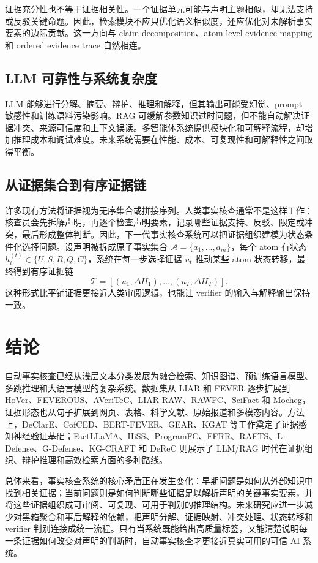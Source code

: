 \documentclass[UTF8,a4paper,zihao=5,twocolumn]{ctexart}
\begin{document}
证据充分性也不等于证据相关性。一个证据单元可能与声明主题相似，却无法支持或反驳关键命题。因此，检索模块不应只优化语义相似度，还应优化对未解析事实要素的边际贡献。这一方向与 claim decomposition、atom-level evidence mapping 和 ordered evidence trace 自然相连。

\subsection{LLM 可靠性与系统复杂度}

LLM 能够进行分解、摘要、辩护、推理和解释，但其输出可能受幻觉、prompt 敏感性和训练语料污染影响。RAG 可缓解参数知识过时问题，但不能自动解决证据冲突、来源可信度和上下文误读。多智能体系统提供模块化和可解释流程，却增加推理成本和调试难度。未来系统需要在性能、成本、可复现性和可解释性之间取得平衡。

\subsection{从证据集合到有序证据链}

许多现有方法将证据视为无序集合或拼接序列。人类事实核查通常不是这样工作：核查员会先拆解声明，再逐个检查声明要素，记录哪些证据支持、反驳、限定或冲突，最后形成整体判断。因此，下一代事实核查系统可以把证据组织建模为状态条件化选择问题。设声明被拆成原子事实集合 $\mathcal{A}=\{a_1,\ldots,a_m\}$，每个 atom 有状态 $h_i^{(t)}\in\{U,S,R,Q,C\}$，系统在每一步选择证据 $u_t$ 推动某些 atom 状态转移，最终得到有序证据链
\begin{equation}
\mathcal{T}=[(u_1,\Delta H_1),\ldots,(u_T,\Delta H_T)].
\end{equation}
这种形式比平铺证据更接近人类审阅逻辑，也能让 verifier 的输入与解释输出保持一致。

\section{结论}

自动事实核查已经从浅层文本分类发展为融合检索、知识图谱、预训练语言模型、多跳推理和大语言模型的复杂系统。数据集从 LIAR 和 FEVER 逐步扩展到 HoVer、FEVEROUS、AVeriTeC、LIAR-RAW、RAWFC、SciFact 和 Mocheg，证据形态也从句子扩展到网页、表格、科学文献、原始报道和多模态内容。方法上，DeClarE、CofCED、BERT-FEVER、GEAR、KGAT 等工作奠定了证据感知神经验证基础；FactLLaMA、HiSS、ProgramFC、FFRR、RAFTS、L-Defense、G-Defense、KG-CRAFT 和 DeReC 则展示了 LLM/RAG 时代在证据组织、辩护推理和高效检索方面的多种路线。

总体来看，事实核查系统的核心矛盾正在发生变化：早期问题是如何从外部知识中找到相关证据；当前问题则是如何判断哪些证据足以解析声明的关键事实要素，并将这些证据组织成可审阅、可复现、可用于判别的推理结构。未来研究应进一步减少对黑箱聚合和事后解释的依赖，把声明分解、证据映射、冲突处理、状态转移和 verifier 判别连接成统一流程。只有当系统既能给出高质量标签，又能清楚说明每一条证据如何改变对声明的判断时，自动事实核查才更接近真实可用的可信 AI 系统。

\printbibliography[title={参考文献}]
\end{document}
